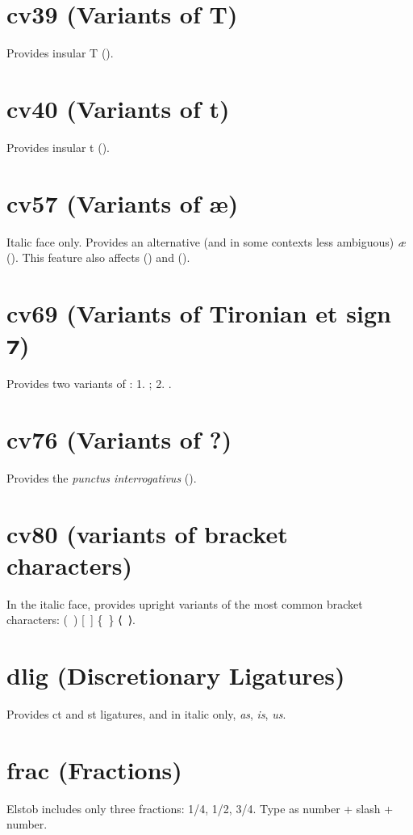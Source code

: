 \documentclass[12pt,letterpaper,openany]{book}
\begin{document}
\section{cv39 (Variants of T)}
Provides insular T ().

\section{cv40 (Variants of t)}
Provides insular t ().

\section{cv57 (Variants of æ)}
Italic face only. Provides an alternative (and in some contexts less ambiguous)
\textit{æ} (\textit{}).
This feature also affects  (\textit{})
and  (\textit{}).

\section{cv69 (Variants of Tironian et sign ⁊)}
Provides two variants of : 1. ; 2. .

\section{cv76 (Variants of ?)}
Provides the \textit{punctus interrogativus} ().

\section{cv80 (variants of bracket characters)}
In the italic face, provides upright variants of the most common bracket
characters: (\ ) [\ ] \{\ \} ⟨\ ⟩.

\section{dlig (Discretionary Ligatures)}
Provides { ct} and
{ st} ligatures, and in italic only,
{ \textit{as}, \textit{is}, \textit{us}}.

\section{frac (Fractions)}
Elstob includes only three fractions: { 1/4, 1/2,
3/4}. Type as number + slash + number.
\end{document}
